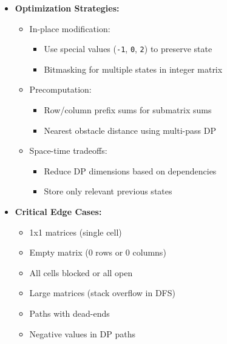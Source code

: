\documentclass[a4paper,10pt]{book}
\begin{document}
\begin{itemize}
    \item \textbf{Optimization Strategies:}
    \begin{itemize}
        \item In-place modification: 
        \begin{itemize}
            \item Use special values (\texttt{-1}, \texttt{0}, \texttt{2}) to preserve state
            \item Bitmasking for multiple states in integer matrix
        \end{itemize}
        \item Precomputation: 
        \begin{itemize}
            \item Row/column prefix sums for submatrix sums
            \item Nearest obstacle distance using multi-pass DP
        \end{itemize}
        \item Space-time tradeoffs: 
        \begin{itemize}
            \item Reduce DP dimensions based on dependencies
            \item Store only relevant previous states
        \end{itemize}
    \end{itemize}
    
    \item \textbf{Critical Edge Cases:}
    \begin{itemize}
        \item 1x1 matrices (single cell)
        \item Empty matrix (0 rows or 0 columns)
        \item All cells blocked or all open
        \item Large matrices (stack overflow in DFS)
        \item Paths with dead-ends
        \item Negative values in DP paths
    \end{itemize}
    

\end{itemize}
\end{document}

